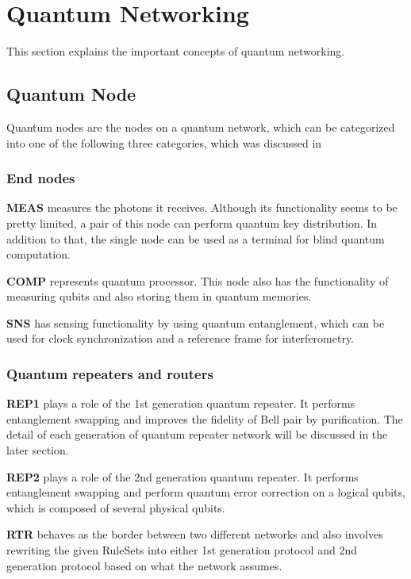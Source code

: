 \section{Quantum Networking}

This section explains the important concepts of quantum networking.

\subsection{Quantum Node}

Quantum nodes are the nodes on a quantum network, which can be categorized into one of the following three categories, which was discussed in \cite{van2022quantum}

\subsubsection{End nodes}

\textbf{MEAS} measures the photons it receives. Although its functionality seems to be pretty limited, a pair of this node can perform quantum key distribution. In addition to that, the single node can be used as a terminal for blind quantum computation.

\textbf{COMP} represents quantum processor.  This node also has the functionality of measuring qubits and also storing them in quantum memories.

\textbf{SNS} has sensing functionality by using quantum entanglement, which can be used for clock synchronization and a reference frame for interferometry. 

\subsubsection{Quantum repeaters and routers}

\textbf{REP1} plays a role of the 1st generation quantum repeater. It performs entanglement swapping and improves the fidelity of Bell pair by purification.
The detail of each generation of quantum repeater network will be discussed in the later section.

\textbf{REP2} plays a role of the 2nd generation quantum repeater. It performs entanglement swapping and perform quantum error correction on a logical qubits, which is composed of several physical qubits.

\textbf{RTR} behaves as the border between two different networks and also involves rewriting the given RuleSets into either 1st generation protocol and 2nd generation protocol based on what the network assumes.

